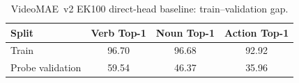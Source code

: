 \begin{table}[t]
\centering
\caption{VideoMAE~v2 EK100 direct-head baseline: train--validation gap.}
\label{tab:videomae-ek100-gap}
\scriptsize
\renewcommand{\arraystretch}{1.03}
\begin{tabularx}{0.70\linewidth}{@{}Lccc@{}}
\toprule\toprule
\textbf{Split} & \textbf{Verb Top-1} & \textbf{Noun Top-1} & \textbf{Action Top-1} \\
\midrule
Train & 96.70 & 96.68 & 92.92 \\
Probe validation & 59.54 & 46.37 & 35.96 \\
\bottomrule\bottomrule
\end{tabularx}
\end{table}
